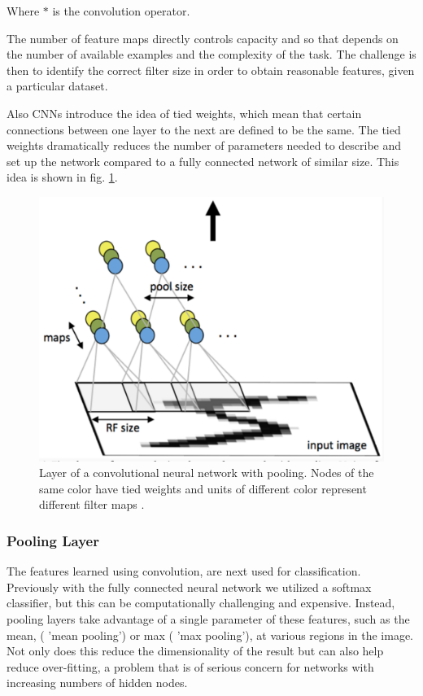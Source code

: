 \documentclass[12pt, twocolumn]{article}
\begin{document}
 Where $\ast$ is the convolution operator. 
 
 The number of feature maps directly controls capacity and so that depends on the number of available examples and the complexity of the task. The challenge is then to identify the correct filter size in order to obtain reasonable features, given a particular dataset.

Also CNNs introduce the idea of tied weights, which mean that certain connections between one layer to the next are defined to be the same. The tied weights dramatically reduces the number of parameters needed to describe and set up the network compared to a fully connected network of similar size. This idea is shown in fig. \ref{fig:conv}.



\begin{figure}
\includegraphics[scale=.4]{convgraphic.png}

\caption{Layer of a convolutional neural network with pooling. Nodes of the same color have tied weights and units of different color represent different filter maps \cite{StanfordTut}. }
\label{fig:conv}
\end{figure}


\subsubsection{Pooling Layer}
The features learned using convolution, are next used for classification. Previously with the fully connected neural network we utilized a softmax classifier, but this can be computationally challenging and expensive. Instead, pooling layers take advantage of a single parameter of these features, such as the mean, ( 'mean pooling') or max ( 'max pooling'), at  various regions in the image. Not only does this reduce the dimensionality of the result but can also help reduce over-fitting, a problem that is of serious concern for networks with increasing numbers of hidden nodes. 
\end{document}
